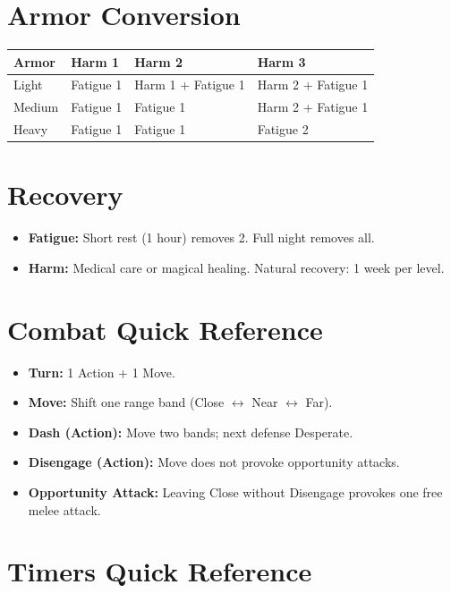 \documentclass[11pt]{book}
\begin{document}
\section{Armor Conversion}

\begin{center}
\begin{tabular}{llll}
\toprule
\textbf{Armor} & \textbf{Harm 1} & \textbf{Harm 2} & \textbf{Harm 3} \\
\midrule
Light & Fatigue 1 & Harm 1 + Fatigue 1 & Harm 2 + Fatigue 1 \\
Medium & Fatigue 1 & Fatigue 1 & Harm 2 + Fatigue 1 \\
Heavy & Fatigue 1 & Fatigue 1 & Fatigue 2 \\
\bottomrule
\end{tabular}
\end{center}

\section{Recovery}

\begin{itemize}
  \item \textbf{Fatigue:} Short rest (1 hour) removes 2. Full night removes all.
  \item \textbf{Harm:} Medical care or magical healing. Natural recovery: 1 week per level.
\end{itemize}

\section{Combat Quick Reference}

\begin{itemize}
  \item \textbf{Turn:} 1 Action + 1 Move.
  \item \textbf{Move:} Shift one range band (Close $\leftrightarrow$ Near $\leftrightarrow$ Far).
  \item \textbf{Dash (Action):} Move two bands; next defense Desperate.
  \item \textbf{Disengage (Action):} Move does not provoke opportunity attacks.
  \item \textbf{Opportunity Attack:} Leaving Close without Disengage provokes one free melee attack.
\end{itemize}

\section{Timers Quick Reference}
\end{document}
